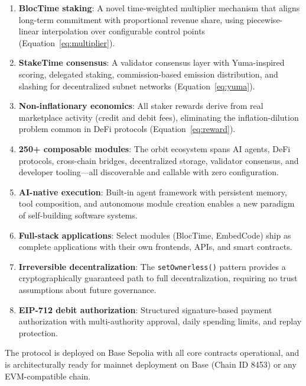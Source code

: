 \documentclass[11pt,a4paper]{article}
\begin{document}
\begin{enumerate}
    \item \textbf{BlocTime staking}: A novel time-weighted multiplier mechanism that aligns long-term commitment with proportional revenue share, using piecewise-linear interpolation over configurable control points (Equation~\ref{eq:multiplier}).

    \item \textbf{StakeTime consensus}: A validator consensus layer with Yuma-inspired scoring, delegated staking, commission-based emission distribution, and slashing for decentralized subnet networks (Equation~\ref{eq:yuma}).

    \item \textbf{Non-inflationary economics}: All staker rewards derive from real marketplace activity (credit and debit fees), eliminating the inflation-dilution problem common in DeFi protocols (Equation~\ref{eq:reward}).

    \item \textbf{250+ composable modules}: The orbit ecosystem spans AI agents, DeFi protocols, cross-chain bridges, decentralized storage, validator consensus, and developer tooling---all discoverable and callable with zero configuration.

    \item \textbf{AI-native execution}: Built-in agent framework with persistent memory, tool composition, and autonomous module creation enables a new paradigm of self-building software systems.

    \item \textbf{Full-stack applications}: Select modules (BlocTime, EmbedCode) ship as complete applications with their own frontends, APIs, and smart contracts.

    \item \textbf{Irreversible decentralization}: The \texttt{setOwnerless()} pattern provides a cryptographically guaranteed path to full decentralization, requiring no trust assumptions about future governance.

    \item \textbf{EIP-712 debit authorization}: Structured signature-based payment authorization with multi-authority approval, daily spending limits, and replay protection.
\end{enumerate}

The protocol is deployed on Base Sepolia with all core contracts operational, and is architecturally ready for mainnet deployment on Base (Chain ID 8453) or any EVM-compatible chain.
\end{document}
